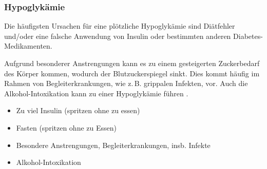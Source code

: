 \subsubsection{Hypoglykämie}
\label{topic:hypoglykaemie}


{%
Die häufigsten Ursachen für eine plötzliche Hypoglykämie
sind Diätfehler und/oder eine falsche Anwendung von Insulin
oder bestimmten anderen Diabetes-Medikamenten. 

Aufgrund
besonderer Anstrengungen kann es zu einem gesteigerten
Zuckerbedarf des Körper kommen, wodurch der
Blutzuckerspiegel sinkt. Dies kommt häufig im Rahmen von
Begleiterkrankungen, wie z.\,B. grippalen Infekten, vor.
Auch die Alkohol-Intoxikation kann zu einer Hypoglykämie
führen \citep{LoefflerBiochemie7}. 
\bigskip
}{%
\begin{itemize}
  \item Zu viel Insulin (spritzen ohne zu essen)
  \item Fasten (spritzen ohne zu Essen)
  \item Besondere Anstrengungen, Begleiterkrankungen,
  insb. Infekte
  \item Alkohol-Intoxikation
\end{itemize}
}{}{}{}






